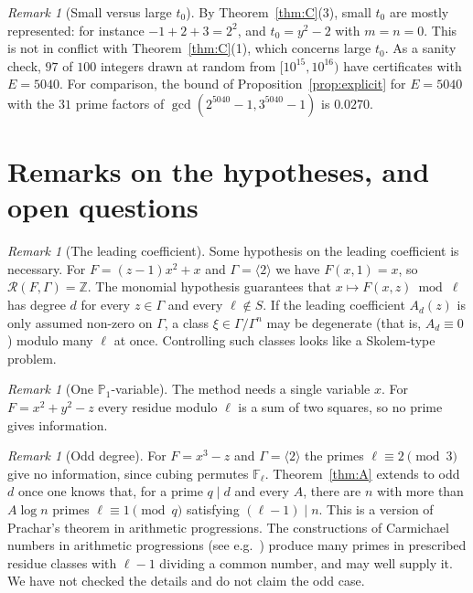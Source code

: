 \documentclass[11pt]{amsart}
\theoremstyle{definition}
\theoremstyle{remark}
\newtheorem{remark}[lemma]{Remark}
\newcommand{\Z}{\mathbb{Z}}
\newcommand{\F}{\mathbb{F}}
\newcommand{\PP}{\mathbb{P}}
\newcommand{\R}{\mathcal{R}}
\begin{document}
\begin{remark}[Small versus large $t_0$]
By Theorem~\ref{thm:C}(3), small $t_0$ are mostly represented: for instance $-1+2+3=2^2$, and $t_0=y^2-2$ with $m=n=0$.
This is not in conflict with Theorem~\ref{thm:C}(1), which concerns large $t_0$.
As a sanity check, $97$ of $100$ integers drawn at random from $[10^{15},10^{16})$ have certificates with $E=5040$.
For comparison, the bound of Proposition~\ref{prop:explicit} for $E=5040$ with the $31$ prime factors of $\gcd(2^{5040}-1,3^{5040}-1)$ is $0.0270$.
\end{remark}

\section{Remarks on the hypotheses, and open questions}\label{sec:remarks}

\begin{remark}[The leading coefficient]
Some hypothesis on the leading coefficient is necessary.
For $F=(z-1)x^2+x$ and $\Gamma=\langle2\rangle$ we have $F(x,1)=x$, so $\R(F,\Gamma)=\Z$.
The monomial hypothesis guarantees that $x\mapsto F(x,z)\bmod\ell$ has degree $d$ for every $z\in\Gamma$ and every $\ell\notin S$.
If the leading coefficient $A_d(z)$ is only assumed non-zero on $\Gamma$, a class $\xi\in\Gamma/\Gamma^n$ may be degenerate (that is, $A_d\equiv0$) modulo many $\ell$ at once.
Controlling such classes looks like a Skolem-type problem.
\end{remark}

\begin{remark}[One $\PP_1$-variable]
The method needs a single variable $x$.
For $F=x^2+y^2-z$ every residue modulo $\ell$ is a sum of two squares, so no prime gives information.
\end{remark}

\begin{remark}[Odd degree]
For $F=x^3-z$ and $\Gamma=\langle2\rangle$ the primes $\ell\equiv2\pmod3$ give no information, since cubing permutes $\F_\ell$.
Theorem~\ref{thm:A} extends to odd $d$ once one knows that, for a prime $q\mid d$ and every $A$, there are $n$ with more than $A\log n$ primes $\ell\equiv1\pmod q$ satisfying $(\ell-1)\mid n$.
This is a version of Prachar's theorem in arithmetic progressions.
The constructions of Carmichael numbers in arithmetic progressions (see e.g.\ \cite{Wri13}) produce many primes in prescribed residue classes with $\ell-1$ dividing a common number, and may well supply it.
We have not checked the details and do not claim the odd case.
\end{remark}
\end{document}
